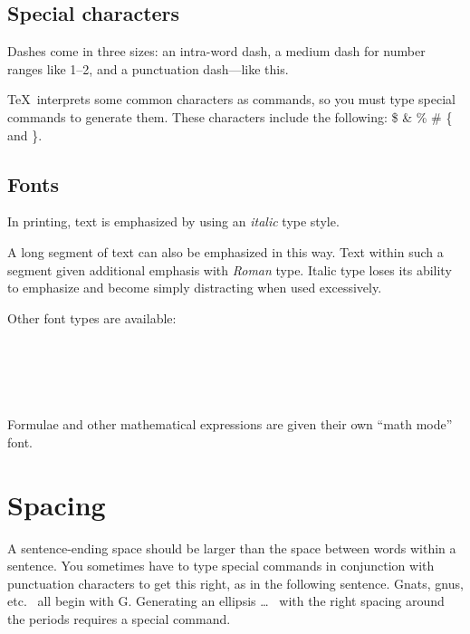 \documentclass[12pt]{article}
\begin{document}
\subsection{Special characters}
Dashes come in three sizes: an
       intra-word
dash, a medium dash for number ranges like
       1--2,
and a punctuation
       dash---like
this.

\TeX\ interprets some common characters as commands, so you must type
special commands to generate them.  These characters include the
following: \$ \& \% \# \{ and \}.

\subsection{Fonts}	
In printing, text is emphasized by using an {\em italic\/}
type style.     %
\begin{em}
   A long segment of text can also be emphasized in this way.  Text within
   such a segment given additional emphasis
          with\/ {\em Roman}
   type.  Italic type loses its ability to emphasize and become simply
   distracting when used excessively.
\end{em}

Other font types are available:    \\
	\\
	\\
	\\
	\\
	\\
Formulae and other mathematical expressions are given
their own ``math mode'' font.

\section{Spacing}
A sentence-ending space should be larger than the space between words
within a sentence.  You sometimes have to type special commands in
conjunction with punctuation characters to get this right, as in the
following sentence.
       Gnats, gnus, etc.\    %
       all begin with G\@.   %
Generating an ellipsis
  \ldots\	%
with the right spacing around the periods requires a special  command.
\end{document}
